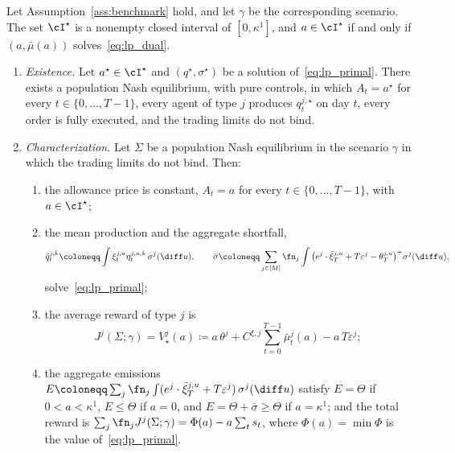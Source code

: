     \begin{theorem}
        \label{thm:benchmark_lp}
        Let Assumption~\ref{ass:benchmark} hold, and let $\gamma$ be the corresponding scenario. The set $\cI^\star$ is a nonempty closed interval of $[0, \kappa^1]$, and $a \in \cI^\star$ if and only if $(a, \bar\mu(a))$ solves~\eqref{eq:lp_dual}.
        \begin{enumerate}
            \item[(i)] \emph{Existence.} Let $a^\star \in \cI^\star$ and $(q^\star, \sigma^\star)$ be a solution of~\eqref{eq:lp_primal}. There exists a population Nash equilibrium, with pure controls, in which $A_t = a^\star$ for every $t \in \{0, \dots, T-1\}$, every agent of type $j$ produces $q^{j,\star}_t$ on day $t$, every order is fully executed, and the trading limits do not bind.
            \item[(ii)] \emph{Characterization.} Let $\Sigma$ be a population Nash equilibrium in the scenario $\gamma$ in which the trading limits do not bind. Then:
            \begin{enumerate}
                \item the allowance price is constant, $A_t = a$ for every $t \in \{0, \dots, T-1\}$, with $a \in \cI^\star$;
                \item the mean production and the aggregate shortfall,
                $$
                    \bar q^{j,k}_t \coloneqq \int \xi^{j,u}_t \eta^{j,u,k}_t \, \sigma^j(\diff u), \qquad \bar\sigma \coloneqq \sum_{j \in [M]} \fn_j \int \big(e^j \cdot \bar\xi^{j,u}_T + T\varepsilon^j - \theta^{j,u}_T\big)^+ \sigma^j(\diff u),
                $$
                solve~\eqref{eq:lp_primal};
                \item the average reward of type $j$ is
                \begin{equation}
                    \label{eq:benchmark_value}
                    J^j(\Sigma; \gamma) = V^j_\star(a) \coloneqq a\, \theta^j + C^{\xi,j} \sum_{t=0}^{T-1} \bar\mu^j_t(a) - a\, T \varepsilon^j;
                \end{equation}
                \item the aggregate emissions $E \coloneqq \sum_{j} \fn_j \int (e^j \cdot \bar\xi^{j,u}_T + T\varepsilon^j)\, \sigma^j(\diff u)$ satisfy $E = \Theta$ if $0 < a < \kappa^1$, $E \le \Theta$ if $a = 0$, and $E = \Theta + \bar\sigma \ge \Theta$ if $a = \kappa^1$; and the total reward is $\sum_{j} \fn_j J^j(\Sigma; \gamma) = \Phi(a) - a \sum_{t} s_t$, where $\Phi(a) = \min \Phi$ is the value of~\eqref{eq:lp_primal}.
            \end{enumerate}
        \end{enumerate}
    \end{theorem}

